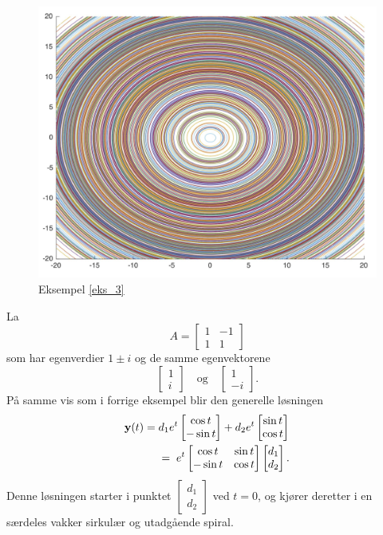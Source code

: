 \begin{figure}[htbp]
  \begin{center}
	\includegraphics[scale=.1]{eks_3.jpg}
	\captionsetup{labelformat=empty}
	\caption{Eksempel \ref{eks_3}}
	\end{center}
\end{figure}



\begin{ex}
\label{eks_4}
La 
\[
A=
\begin{bmatrix}
1 & -1   \\
1 & 1
\end{bmatrix}
\]
som har egenverdier $1\pm i$ og de samme egenvektorene
\[
\begin{bmatrix}
1  \\
i 
\end{bmatrix}
\quad \text{og} \quad
\begin{bmatrix}
1  \\
-i 
\end{bmatrix}. 
\]
På samme vis som i forrige eksempel blir den generelle løsningen 
\begin{align*}
\mathbf{y}(t)=\;&d_1e^t\begin{bmatrix} \cos t \\ -\sin t\end{bmatrix}+d_2e^t\begin{bmatrix}  \sin t \\ \cos t\end{bmatrix}\\&=\;e^t\begin{bmatrix} \cos t & \sin t\\ -\sin t & \cos t\end{bmatrix}\begin{bmatrix} d_1 \\ d_2 \end{bmatrix}.
\end{align*}
Denne løsningen starter i punktet $\begin{bmatrix} d_1 \\ d_2 \end{bmatrix}$ ved $t=0$, og kjører deretter i en særdeles vakker sirkulær og utadgående spiral.
\end{ex}


